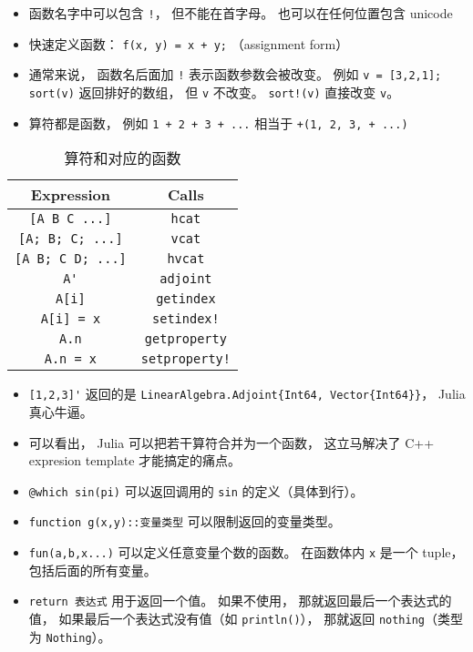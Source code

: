 
\begin{issues}
\issueDraft
\end{issues}

\begin{itemize}
\item 函数名字中可以包含 \verb|!|， 但不能在首字母。 也可以在任何位置包含 unicode
\item 快速定义函数： \verb|f(x, y) = x + y;| （assignment form）
\item 通常来说， 函数名后面加 \verb|!| 表示函数参数会被改变。 例如 \verb|v = [3,2,1]; sort(v)| 返回排好的数组， 但 \verb|v| 不改变。 \verb|sort!(v)| 直接改变 \verb|v|。
\item 算符都是函数， 例如 \verb|1 + 2 + 3 + ...| 相当于 \verb|+(1, 2, 3, + ...)|
\end{itemize}


\begin{table}[ht]
\centering
\caption{算符和对应的函数}\label{JuFunc_tab1}
\begin{tabular}{|c|c|}
\hline
Expression & Calls \\
\hline
\verb|[A B C ...]| & \verb|hcat| \\
\hline
\verb|[A; B; C; ...]| & \verb|vcat| \\
\hline
\verb|[A B; C D; ...]| & \verb|hvcat| \\
\hline
\verb|A'| & \verb|adjoint| \\
\hline
\verb|A[i]| & \verb|getindex| \\
\hline
\verb|A[i] = x| & \verb|setindex!| \\
\hline
\verb|A.n| & \verb|getproperty| \\
\hline
\verb|A.n = x| & \verb|setproperty!| \\
\hline
\end{tabular}
\end{table}

\begin{itemize}
\item \verb|[1,2,3]'| 返回的是 \verb|LinearAlgebra.Adjoint{Int64, Vector{Int64}}|， Julia 真心牛逼。
\item 可以看出， Julia 可以把若干算符合并为一个函数， 这立马解决了 C++ expresion template 才能搞定的痛点。
\item \verb|@which sin(pi)| 可以返回调用的 \verb|sin| 的定义（具体到行）。
\item \verb|function g(x,y)::变量类型| 可以限制返回的变量类型。
\item \verb|fun(a,b,x...)| 可以定义任意变量个数的函数。 在函数体内 \verb|x| 是一个 tuple， 包括后面的所有变量。
\item \verb|return 表达式| 用于返回一个值。 如果不使用， 那就返回最后一个表达式的值， 如果最后一个表达式没有值（如 \verb|println()|）， 那就返回 \verb|nothing|（类型为 \verb|Nothing|）。
\end{itemize}

